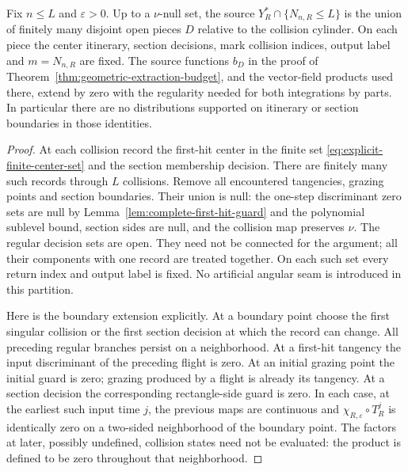 \begin{lemma}
\label{lem:source-partition-zero-extension}
Fix $n\le L$ and $\varepsilon>0$. Up to a $\nu$-null set, the source
$Y_R^*\cap\{N_{n,R}\le L\}$ is the union of finitely many disjoint open
pieces $D$ relative to the collision cylinder. On each piece the center
itinerary, section decisions, mark collision indices, output label and
$m=N_{n,R}$ are fixed. The source functions $b_D$ in the proof of
Theorem~\ref{thm:geometric-extraction-budget}, and the vector-field
products used there, extend by zero with the regularity needed for both
integrations by parts. In particular there are no distributions
supported on itinerary or section boundaries in those identities.
\end{lemma}
\begin{proof}
At each collision record the first-hit center in the finite set
\eqref{eq:explicit-finite-center-set} and the section membership decision.
There are finitely many such records through $L$ collisions. Remove
all encountered tangencies, grazing points and section boundaries.
Their union is null: the one-step discriminant zero sets are null by
Lemma~\ref{lem:complete-first-hit-guard} and the polynomial sublevel
bound, section sides are null, and the collision map preserves $\nu$.
The regular decision sets are open. They need not be connected for the
argument; all their components with one record are treated together.
On each such set every return index and output label is fixed. No
artificial angular seam is introduced in this partition.

Here is the boundary extension explicitly. At a boundary point choose
the first singular collision or the first section decision at which the
record can change. All preceding regular branches persist on a
neighborhood. At a first-hit tangency the input discriminant of the
preceding flight is zero. At an initial grazing point the initial guard
is zero; grazing produced by a flight is already its tangency. At a
section decision the corresponding rectangle-side guard is zero.
In each case, at the earliest such input time $j$, the previous maps
are continuous and $\chi_{R,\varepsilon}\circ T_R^j$ is identically
zero on a two-sided neighborhood of the boundary point. The factors
at later, possibly undefined, collision states need not be evaluated:
the product is defined to be zero throughout that neighborhood.


\end{proof}
